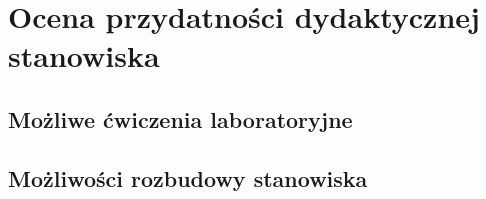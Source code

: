 \chapter{Ocena przydatności dydaktycznej stanowiska}
\label{chap: Ocena przydatności dydaktycznej stanowiska}

\section{Możliwe ćwiczenia laboratoryjne}
\label{sec: Możliwe ćwiczenia laboratoryjne}

\section{Możliwości rozbudowy stanowiska}
\label{sec: Możliwości rozbudowy stanowiska}
